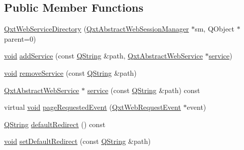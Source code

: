 \subsection*{Public Member Functions}
\begin{DoxyCompactItemize}
\item 
\hyperlink{class_qxt_web_service_directory_a6bf41820673aebe2a07a25f32c19f784}{Qxt\-Web\-Service\-Directory} (\hyperlink{class_qxt_abstract_web_session_manager}{Qxt\-Abstract\-Web\-Session\-Manager} $\ast$sm, Q\-Object $\ast$parent=0)
\item 
\hyperlink{group___u_a_v_objects_plugin_ga444cf2ff3f0ecbe028adce838d373f5c}{void} \hyperlink{class_qxt_web_service_directory_a296db6823177ac67fb9dfdb079ec9d2c}{add\-Service} (const \hyperlink{group___u_a_v_objects_plugin_gab9d252f49c333c94a72f97ce3105a32d}{Q\-String} \&path, \hyperlink{class_qxt_abstract_web_service}{Qxt\-Abstract\-Web\-Service} $\ast$\hyperlink{class_qxt_web_service_directory_a4692f2bb045fb0f391b96128a2066fb7}{service})
\item 
\hyperlink{group___u_a_v_objects_plugin_ga444cf2ff3f0ecbe028adce838d373f5c}{void} \hyperlink{class_qxt_web_service_directory_a986a33319b57447044b3ef2075205818}{remove\-Service} (const \hyperlink{group___u_a_v_objects_plugin_gab9d252f49c333c94a72f97ce3105a32d}{Q\-String} \&path)
\item 
\hyperlink{class_qxt_abstract_web_service}{Qxt\-Abstract\-Web\-Service} $\ast$ \hyperlink{class_qxt_web_service_directory_a4692f2bb045fb0f391b96128a2066fb7}{service} (const \hyperlink{group___u_a_v_objects_plugin_gab9d252f49c333c94a72f97ce3105a32d}{Q\-String} \&path) const 
\item 
virtual \hyperlink{group___u_a_v_objects_plugin_ga444cf2ff3f0ecbe028adce838d373f5c}{void} \hyperlink{class_qxt_web_service_directory_a36b4af936bb1dad3a1b86ead54da384c}{page\-Requested\-Event} (\hyperlink{class_qxt_web_request_event}{Qxt\-Web\-Request\-Event} $\ast$event)
\item 
\hyperlink{group___u_a_v_objects_plugin_gab9d252f49c333c94a72f97ce3105a32d}{Q\-String} \hyperlink{class_qxt_web_service_directory_ab61356b17ef544c2869e15dbad8de289}{default\-Redirect} () const 
\item 
\hyperlink{group___u_a_v_objects_plugin_ga444cf2ff3f0ecbe028adce838d373f5c}{void} \hyperlink{class_qxt_web_service_directory_acda443b6ab3499c2ae5682cbe2a15937}{set\-Default\-Redirect} (const \hyperlink{group___u_a_v_objects_plugin_gab9d252f49c333c94a72f97ce3105a32d}{Q\-String} \&path)
\end{DoxyCompactItemize}
